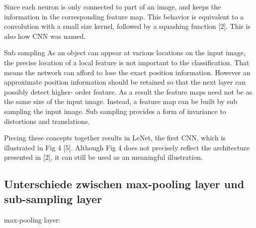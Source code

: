 \documentclass{sig-alternate-05-2015}
\begin{document}
Since each neuron is only connected to part of an image, and keeps the information in the corresponding feature map. This behavior is equivalent to a convolution with a small size kernel, followed by a squashing function [2]. This is also how CNN was named.

Sub sampling
As an object can appear at various locations on the input image, the precise location of a local feature is not important to the classification. That means the network can afford to lose the exact position information. However an approximate position information should be retained so that the next layer can possibly detect higher- order feature. As a result the feature maps need not be as the same size of the input image. Instead, a feature map can be built by sub sampling the input image. Sub sampling provides a form of invariance to distortions and translations.

Piecing these concepts together results in LeNet, the first CNN, which is illustrated in Fig 4 [5]. Although Fig 4 does not precisely reflect the architecture presented in [2], it can still be used as an meaningful illustration.

\subsection{Unterschiede zwischen max-pooling layer und sub-sampling layer}
max-pooling layer: \cite{6033458}


 




\balancecolumns
\end{document}
